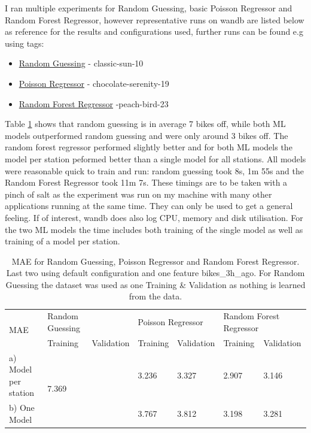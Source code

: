 \documentclass[a4paper]{article}
\begin{document}
    I ran multiple experiments for Random Guessing, basic Poisson Regressor and Random Forest Regressor, however
    representative runs on wandb are listed below as reference for the results and configurations used, further runs can
    be found e.g using tags:
    \begin{itemize}
        \item \href{https://wandb.ai/idegen/mlp-2021/runs/3k64fgcw/overview?workspace=user-idegen}{Random Guessing} - classic-sun-10
        \item \href{https://wandb.ai/idegen/mlp-2021/runs/1iyx8zmh/overview?workspace=user-idegen}{Poisson Regressor} - chocolate-serenity-19
        \item \href{https://wandb.ai/idegen/mlp-2021/runs/25zvoihx/overview?workspace=user-idegen}{Random Forest Regressor} -peach-bird-23
    \end{itemize}

    Table \ref{tbl:phase1-step2-simple-model-mae} shows that random guessing is in average 7 bikes off, while both ML models
    outperformed random guessing and were only around 3 bikes off. The random forest regressor performed slightly better and
    for both ML models the model per station peformed better than a single model for all stations. All models
    were reasonable quick to train and run: random guessing took 8s, 1m 55s and the Random Forest Regressor took 11m 7s.
    These timings are to be taken with a pinch of salt as the experiment was run on my machine with many other applications
    running at the same time. They can only be used to get a general feeling. If of interest, wandb does
    also log CPU, memory and disk utilisation. For the two ML models the time includes both training of the single model
    as well as training of a model per station.

    \begin{table}[h]
        \centering
        \begin{tabularx}{\textwidth}{|X|XX|XX|XX|}
            \hline
            \multirow{2}{*}{MAE} & \multicolumn{1}{l|}{Random Guessing} & & \multicolumn{2}{l|}{Poisson Regressor} & \multicolumn{2}{l|}{Random Forest Regressor} \\ \cline{2-7}
            & \multicolumn{1}{l|}{Training} & Validation & \multicolumn{1}{l|}{Training} & Validation & \multicolumn{1}{l|}{Training} & Validation \\ \hline
            a) Model per station & \multicolumn{2}{l|}{\multirow{2}{*}{7.369}} & \multicolumn{1}{l|}{3.236}    & 3.327      & \multicolumn{1}{l|}{2.907}    & 3.146      \\ \cline{1-1} \cline{4-7}
            b) One Model & \multicolumn{2}{l|}{} & \multicolumn{1}{l|}{3.767} & 3.812 & \multicolumn{1}{l|}{3.198}    & 3.281      \\ \hline
        \end{tabularx}
        \caption{MAE for Random Guessing, Poisson Regressor and Random Forest Regressor. Last two using default configuration and one feature bikes\_3h\_ago. For
        Random Guessing the dataset was used as one Training \& Validation as nothing is learned from the data.}
        \label{tbl:phase1-step2-simple-model-mae}
    \end{table}
\end{document}

